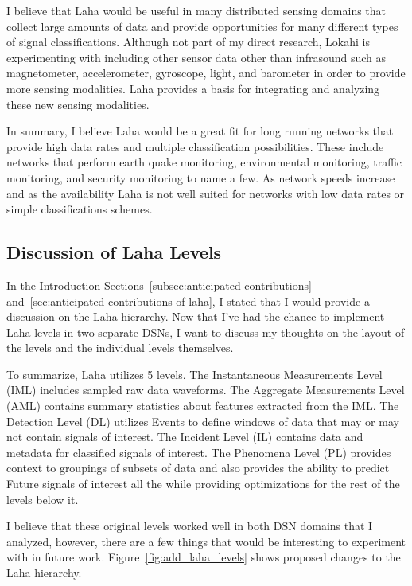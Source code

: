 I believe that Laha would be useful in many distributed sensing domains that collect large amounts of data and provide opportunities for many different types of signal classifications. Although not part of my direct research, Lokahi is experimenting with including other sensor data other than infrasound such as magnetometer, accelerometer, gyroscope, light, and barometer in order to provide more sensing modalities. Laha provides a basis for integrating and analyzing these new sensing modalities.

In summary, I believe Laha would be a great fit for long running networks that provide high data rates and multiple classification possibilities. These include networks that perform earth quake monitoring, environmental monitoring, traffic monitoring, and security monitoring to name a few. As network speeds increase and as the availability  Laha is not well suited for networks with low data rates or simple classifications schemes.

\subsection{Discussion of Laha Levels}\label{subsec:discussion-of-laha-levels}

In the Introduction Sections~\ref{subsec:anticipated-contributions} and~\ref{sec:anticipated-contributions-of-laha}, I stated that I would provide a discussion on the Laha hierarchy. Now that I've had the chance to implement Laha levels in two separate DSNs, I want to discuss my thoughts on the layout of the levels and the individual levels themselves.

To summarize, Laha utilizes 5 levels. The Instantaneous Measurements Level (IML) includes sampled raw data waveforms. The Aggregate Measurements Level (AML) contains summary statistics about features extracted from the IML. The Detection Level (DL) utilizes Events to define windows of data that may or may not contain signals of interest. The Incident Level (IL) contains data and metadata for classified signals of interest. The Phenomena Level (PL) provides context to groupings of subsets of data and also provides the ability to predict Future signals of interest all the while providing optimizations for the rest of the levels below it.

I believe that these original levels worked well in both DSN domains that I analyzed, however, there are a few things that would be interesting to experiment with in future work. Figure~\ref{fig:add_laha_levels} shows proposed changes to the Laha hierarchy.

